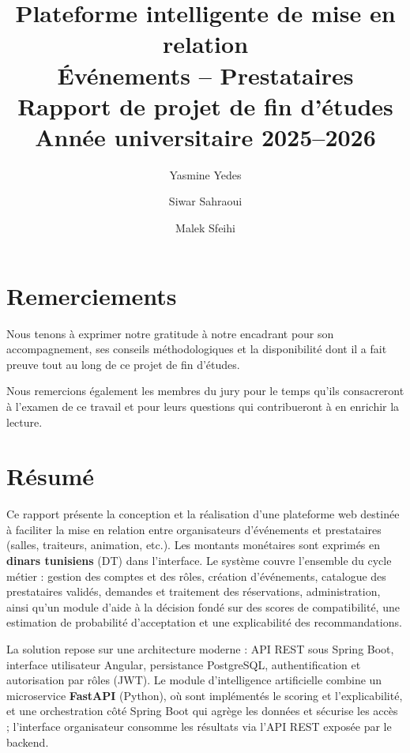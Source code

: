 \documentclass[a4paper,12pt]{report}
\title{%
  \textbf{\textcolor{accent}{Plateforme intelligente de mise en relation\\
  Événements -- Prestataires}}\\[0.5cm]
  \large Rapport de projet de fin d'études\\[0.3cm]
  \normalsize Année universitaire 2025--2026%
}
\author{%
  Yasmine Yedes \and
  Siwar Sahraoui \and
  Malek Sfeihi%
}
\date{}
\begin{document}
\maketitle
\thispagestyle{empty}

\chapter*{Remerciements}

\noindent
Nous tenons à exprimer notre gratitude à notre encadrant pour son accompagnement, ses conseils méthodologiques et la disponibilité dont il a fait preuve tout au long de ce projet de fin d'études.

\vspace{1em}

\noindent
Nous remercions également les membres du jury pour le temps qu'ils consacreront à l'examen de ce travail et pour leurs questions qui contribueront à en enrichir la lecture.

\chapter*{Résumé}

\noindent
Ce rapport présente la conception et la réalisation d'une plateforme web destinée à faciliter la mise en relation entre organisateurs d'événements et prestataires (salles, traiteurs, animation, etc.). Les montants monétaires sont exprimés en \textbf{dinars tunisiens} (DT) dans l'interface. Le système couvre l'ensemble du cycle métier : gestion des comptes et des rôles, création d'événements, catalogue des prestataires validés, demandes et traitement des réservations, administration, ainsi qu'un module d'aide à la décision fondé sur des scores de compatibilité, une estimation de probabilité d'acceptation et une explicabilité des recommandations.

\vspace{0.5em}

\noindent
La solution repose sur une architecture moderne : API REST sous Spring Boot, interface utilisateur Angular, persistance PostgreSQL, authentification et autorisation par rôles (JWT). Le module d'intelligence artificielle combine un microservice \textbf{FastAPI} (Python), où sont implémentés le scoring et l'explicabilité, et une orchestration côté Spring Boot qui agrège les données et sécurise les accès ; l'interface organisateur consomme les résultats via l'API REST exposée par le backend.
\end{document}
